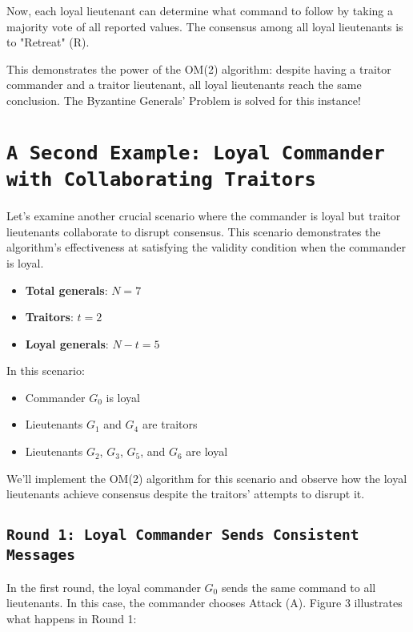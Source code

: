 \documentclass[11pt]{article}
\newcommand{\gen}[1]{\ensuremath{G_{#1}}}
\begin{document}
Now, each loyal lieutenant can determine what command to follow by taking a majority vote of all reported values. The consensus among all loyal lieutenants is to "Retreat" (R).

This demonstrates the power of the OM(2) algorithm: despite having a traitor commander and a traitor lieutenant, all loyal lieutenants reach the same conclusion. The Byzantine Generals' Problem is solved for this instance!

\section*{\texttt{\Large A Second Example: Loyal Commander with Collaborating Traitors}}

\justifying
Let's examine another crucial scenario where the commander is loyal but traitor lieutenants collaborate to disrupt consensus. This scenario demonstrates the algorithm's effectiveness at satisfying the validity condition when the commander is loyal.

\begin{itemize}
    \item \textbf{Total generals}: $N = 7$
    \item \textbf{Traitors}: $t = 2$
    \item \textbf{Loyal generals}: $N - t = 5$
\end{itemize}

In this scenario:
\begin{itemize}
    \item Commander $\gen{0}$ is loyal
    \item Lieutenants $\gen{1}$ and $\gen{4}$ are traitors
    \item Lieutenants $\gen{2}$, $\gen{3}$, $\gen{5}$, and $\gen{6}$ are loyal
\end{itemize}

We'll implement the OM(2) algorithm for this scenario and observe how the loyal lieutenants achieve consensus despite the traitors' attempts to disrupt it.

\subsection*{\texttt{\large Round 1: Loyal Commander Sends Consistent Messages}}
\justifying
In the first round, the loyal commander $\gen{0}$ sends the same command to all lieutenants. In this case, the commander chooses Attack (A). Figure 3 illustrates what happens in Round 1:
\end{document}
